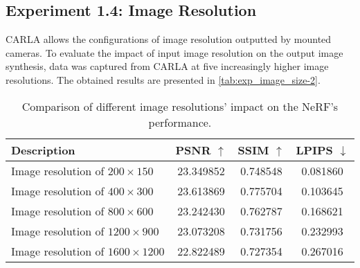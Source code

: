 








\subsection{Experiment 1.4: Image Resolution} \label{sec:exp-image-resolution}
CARLA allows the configurations of image resolution outputted by mounted cameras. To evaluate the impact of input image resolution on the output image synthesis, data was captured from CARLA at five increasingly higher image resolutions. The obtained results are presented in \autoref{tab:exp_image_size-2}.

\begin{table}[ht]
\centering
\setlength{\tabcolsep}{6pt}
\renewcommand{\arraystretch}{1.5}
\begin{tabular}{l | C{2.2} C{1.3} C{1.3}}
\hline
\textbf{Description} & \textbf{PSNR $\uparrow$} & \textbf{SSIM $\uparrow$} & \textbf{LPIPS $\downarrow$} \\
\hline
Image resolution of $200 \times 150$ & 23.349852 & 0.748548 &  0.081860 \\
Image resolution of $400 \times 300$ &  23.613869 &  0.775704 & 0.103645 \\
Image resolution of $800 \times 600$ & 23.242430 & 0.762787 & 0.168621 \\
Image resolution of $1200 \times 900$ & 23.073208 & 0.731756 & 0.232993 \\
Image resolution of $1600 \times 1200$ &  22.822489 &  0.727354 &  0.267016 \\
\hline
\end{tabular}
\caption[Results for experiment 1.4: Image resolution]{Comparison of different image resolutions' impact on the NeRF's performance.}
\label{tab:exp_image_size-2}
\end{table}

